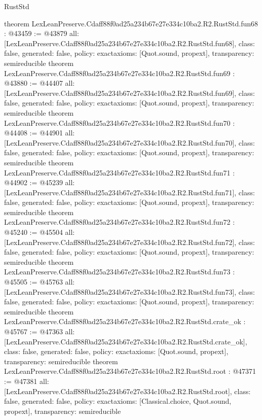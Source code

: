 \begin{lexlean}{RustStd}
\begin{coremodule}
{}
theorem LexLeanPreserve.Cdaff88f0ad25a234b67e27e334c10ba2.R2.RustStd.fun68 : @43459 := @43879 {
  all: [LexLeanPreserve.Cdaff88f0ad25a234b67e27e334c10ba2.R2.RustStd.fun68],
  class: false,
  generated: false,
  policy: exact{axioms: [Quot.sound, propext]},
  transparency: semireducible
}
theorem LexLeanPreserve.Cdaff88f0ad25a234b67e27e334c10ba2.R2.RustStd.fun69 : @43880 := @44407 {
  all: [LexLeanPreserve.Cdaff88f0ad25a234b67e27e334c10ba2.R2.RustStd.fun69],
  class: false,
  generated: false,
  policy: exact{axioms: [Quot.sound, propext]},
  transparency: semireducible
}
theorem LexLeanPreserve.Cdaff88f0ad25a234b67e27e334c10ba2.R2.RustStd.fun70 : @44408 := @44901 {
  all: [LexLeanPreserve.Cdaff88f0ad25a234b67e27e334c10ba2.R2.RustStd.fun70],
  class: false,
  generated: false,
  policy: exact{axioms: [Quot.sound, propext]},
  transparency: semireducible
}
theorem LexLeanPreserve.Cdaff88f0ad25a234b67e27e334c10ba2.R2.RustStd.fun71 : @44902 := @45239 {
  all: [LexLeanPreserve.Cdaff88f0ad25a234b67e27e334c10ba2.R2.RustStd.fun71],
  class: false,
  generated: false,
  policy: exact{axioms: [Quot.sound, propext]},
  transparency: semireducible
}
theorem LexLeanPreserve.Cdaff88f0ad25a234b67e27e334c10ba2.R2.RustStd.fun72 : @45240 := @45504 {
  all: [LexLeanPreserve.Cdaff88f0ad25a234b67e27e334c10ba2.R2.RustStd.fun72],
  class: false,
  generated: false,
  policy: exact{axioms: [Quot.sound, propext]},
  transparency: semireducible
}
theorem LexLeanPreserve.Cdaff88f0ad25a234b67e27e334c10ba2.R2.RustStd.fun73 : @45505 := @45763 {
  all: [LexLeanPreserve.Cdaff88f0ad25a234b67e27e334c10ba2.R2.RustStd.fun73],
  class: false,
  generated: false,
  policy: exact{axioms: [Quot.sound, propext]},
  transparency: semireducible
}
theorem LexLeanPreserve.Cdaff88f0ad25a234b67e27e334c10ba2.R2.RustStd.crate_ok : @45767 := @47363 {
  all: [LexLeanPreserve.Cdaff88f0ad25a234b67e27e334c10ba2.R2.RustStd.crate_ok],
  class: false,
  generated: false,
  policy: exact{axioms: [Quot.sound, propext]},
  transparency: semireducible
}
theorem LexLeanPreserve.Cdaff88f0ad25a234b67e27e334c10ba2.R2.RustStd.root : @47371 := @47381 {
  all: [LexLeanPreserve.Cdaff88f0ad25a234b67e27e334c10ba2.R2.RustStd.root],
  class: false,
  generated: false,
  policy: exact{axioms: [Classical.choice, Quot.sound, propext]},
  transparency: semireducible
}


\end{coremodule}
\end{lexlean}
